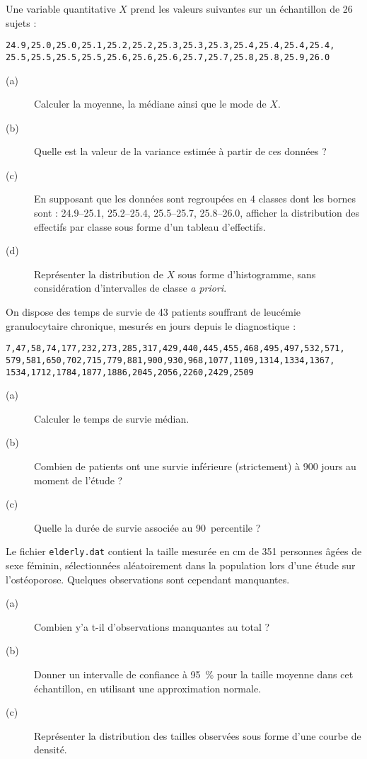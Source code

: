 \begin{exo}\label{exo:2.1}
Une variable quantitative $X$ prend les valeurs suivantes sur un échantillon
de 26 sujets :
\begin{verbatim}
24.9,25.0,25.0,25.1,25.2,25.2,25.3,25.3,25.3,25.4,25.4,25.4,25.4,
25.5,25.5,25.5,25.5,25.6,25.6,25.6,25.7,25.7,25.8,25.8,25.9,26.0
\end{verbatim}
\begin{description}
\item[(a)] Calculer la moyenne, la médiane ainsi que le mode de $X$. 
\item[(b)]  Quelle est la valeur de la variance estimée à partir de ces données ? 
\item[(c)] En supposant que les données sont regroupées en 4 classes dont les
  bornes sont : 24.9–25.1, 25.2–25.4, 25.5–25.7, 25.8–26.0, afficher la
  distribution des effectifs par classe sous forme d'un tableau d'effectifs. 
\item[(d)] Représenter la distribution de $X$ sous forme d'histogramme, sans
  considération d'intervalles de classe \emph{a priori}.
\end{description}
\end{exo}

\begin{exo}\label{exo:2.2}
On dispose des temps de survie de 43 patients souffrant de leucémie
granulocytaire chronique, mesurés en jours depuis le diagnostique :
\autocite[p.~38]{everitt01} 
\begin{verbatim}
7,47,58,74,177,232,273,285,317,429,440,445,455,468,495,497,532,571,
579,581,650,702,715,779,881,900,930,968,1077,1109,1314,1334,1367,
1534,1712,1784,1877,1886,2045,2056,2260,2429,2509
\end{verbatim}
\begin{description}
\item[(a)] Calculer le temps de survie médian. 
\item[(b)] Combien de patients ont une survie inférieure (strictement) à 900
  jours au moment de l'étude ? 
\item[(c)] Quelle la durée de survie associée au 90\ieme\ percentile ?
\end{description}
\end{exo}

\begin{exo}\label{exo:2.3}
Le fichier \texttt{elderly.dat} contient la taille mesurée en cm de 351
personnes âgées de sexe féminin, sélectionnées aléatoirement dans la
population lors d'une étude sur l'ostéoporose. Quelques observations sont
cependant manquantes.
\begin{description}
\item[(a)] Combien y'a t-il d'observations manquantes au total ?
\item[(b)] Donner un intervalle de confiance à 95~\% pour la taille moyenne
  dans cet échantillon, en utilisant une approximation normale.
\item[(c)] Représenter la distribution des tailles observées sous forme
  d'une courbe de densité.  
\end{description}
\end{exo}


